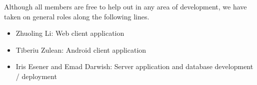 Although all members are free to help out in any area of development, we have taken on general roles along the following lines.

\begin{itemize}
\item Zhuoling Li: Web client application
\item Tiberiu Zulean: Android client application
\item Iris Esener and Emad Darwish: Server application and database development / deployment
\end{itemize}